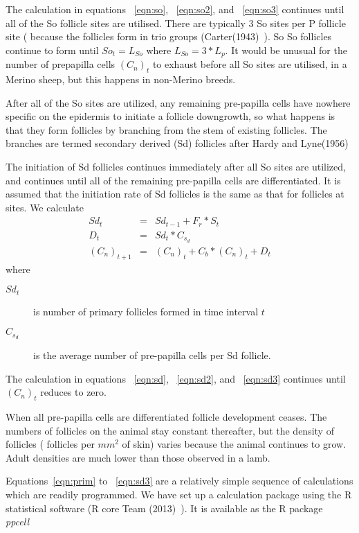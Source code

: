 \documentclass[titlepage]{article}  %
\begin{document}
The calculation in equations ~\ref{eqn:so}, ~\ref{eqn:so2}, and ~\ref{eqn:so3} continues until all of the So follicle sites are utilised. There are typically 3 So sites per P follicle site ( because the follicles form in trio groups (Carter(1943)~\cite{cart:43}). So So follicles continue to form until $ So_{t} = L_{So} $  where $L_{So} = 3 * L_{p} $. It would be unusual for the number of prepapilla cells $(C_{n})_{t}$ to exhaust before all So sites are utilised, in a Merino sheep, but this happens in non-Merino breeds. 

After all of the So sites are utilized, any remaining pre-papilla cells have nowhere specific on the epidermis to initiate a follicle downgrowth, so what happens is that they form follicles by branching from the stem of existing follicles. The branches are termed secondary derived (Sd) follicles after Hardy and Lyne(1956)~\cite{hard:56}

The initiation of Sd follicles continues immediately after all So sites are utilized, and continues until all of the remaining pre-papilla cells are differentiated. It is assumed that the initiation rate of Sd follicles is the same as that for follicles at sites. We calculate
\begin{eqnarray}
\label{eqn:sd}
Sd_{t} & = & Sd_{t-1} +  F_{r} * S_{t} \\
\label{eqn:sd2}
D_{t} & = & Sd_{t} * C_{s_{d}} \\
\label{eqn:sd3}
(C_{n})_{t+1} & = & (C_{n})_{t} + C_{b} * (C_{n})_{t} + D_{t}
\end{eqnarray}
where
\begin{description}
\item[$Sd_{t}$] is number of primary follicles formed in time interval $t$
\item[$C_{s_{d}}$] is the average number of pre-papilla cells per Sd follicle.
\end{description}
 
The calculation in equations ~\ref{eqn:sd}, ~\ref{eqn:sd2}, and ~\ref{eqn:sd3} continues until $(C_{n})_{t}$ reduces to zero.

When all pre-papilla cells are differentiated follicle development ceases. The numbers of follicles on the animal stay constant thereafter, but the density of follicles ( follicles per $mm^{2}$ of skin) varies because the animal continues to grow.  Adult densities are much lower than those observed in a lamb.

Equations~\ref{eqn:prim} to ~\ref{eqn:sd3} are a relatively simple sequence of calculations which are readily programmed. We have set up a calculation package using the R statistical software (R core Team (2013)~\cite{rprog:13}). It is available as the R package {\em ppcell}~\cite{jack:18} 
\end{document}
